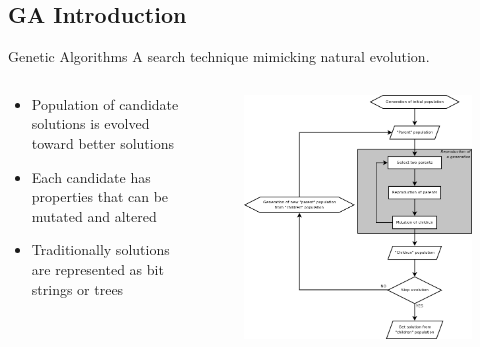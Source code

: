 \subsection{GA Introduction}
\begin{frame}{Genetic Algorithms}
A search technique mimicking natural evolution.
\begin{columns}[onlytextwidth]
\begin{column}{0.45\textwidth}
\small
\begin{itemize}
	\item Population of candidate solutions is evolved toward better solutions
	\item Each candidate has properties that can be mutated and altered
	\item Traditionally solutions are represented as bit strings or trees
\end{itemize}
\end{column}
\begin{column}{0.45\textwidth}
	\centering
	\begin{figure}
		\includegraphics[width=\textwidth]{genetic_algorithm_principle}
	\end{figure}
\end{column}
\end{columns}
\end{frame}

